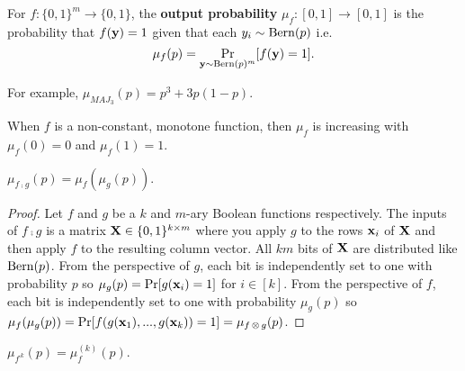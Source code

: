 \documentclass[11pt]{article}
\begin{document}
		\begin{definition}
			\label{def:FUN-OutputProb}
			For $f: \{0,1\}^m \rightarrow \{0,1\}$, the \textbf{output probability} $\mu_f: [0,1] \rightarrow [0,1]$ is the probability that $f(\mathbf{y}) = 1$ given that each $y_i \sim \operatorname*{\mathrm{Bern}}(p)$ i.e.
			\[\mu_{f}(p) = \Pr_{\mathbf{y} \sim \operatorname*{\mathrm{Bern}}(p)^{m}}[f(\mathbf{y}) = 1].\]
			
			For example, $\mu_{MAJ_3}(p) = p^3 + 3p(1-p)$.
		\end{definition}
	
		When $f$ is a non-constant, monotone function, then $\mu_{f}$ is increasing with $\mu_f(0) = 0$ and $\mu_f(1) = 1$.
		
		\begin{lemma}
			 $\mu_{f \comp g}(p) = \mu_f(\mu_g(p))$.
		\end{lemma}	
		\begin{proof}
			Let $f$ and $g$ be a $k$ and $m$-ary Boolean functions respectively. The inputs of $f \comp g$ is a matrix $\mathbf{X} \in \{0,1\}^{k \times m}$ where you apply $g$ to the rows $\mathbf{x}_i$ of $\mathbf{X}$ and then apply $f$ to the resulting column vector. All $km$ bits of $\mathbf{X}$ are distributed like $\operatorname*{\mathrm{Bern}}(p)$. From the perspective of $g$, each bit is independently set to one with probability $p$ so $\mu_g(p) = \Pr[g(\mathbf{x}_i) = 1]$ for $i \in [k]$. From the perspective of $f$, each bit is independently set to one with probability $\mu_g(p)$ so $\mu_f(\mu_g(p)) = \Pr[f(g(\mathbf{x}_1), ..., g(\mathbf{x}_k)) = 1] = \mu_{f \operatorname*{\otimes} g}(p)$.   
		\end{proof}
		\begin{corollary}
			$\mu_{f^{\comp k}}(p) = \mu^{(k)}_{f}(p)$.
		\end{corollary}
		
\end{document}
